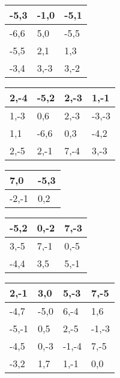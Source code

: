 \documentclass{article}
\begin{document}
\begin{table}[]
\centering
\begin{tabular}{|l|l|l|}
\hline-5,3 & -1,0 & -5,1\\ \hline
-6,6 & 5,0 & -5,5\\ \hline
-5,5 & 2,1 & 1,3\\ \hline
-3,4 & 3,-3 & 3,-2\\ \hline
\end{tabular}
\end{table}

\begin{table}[]
\centering
\begin{tabular}{|l|l|l|l|}
\hline2,-4 & -5,2 & 2,-3 & 1,-1\\ \hline
1,-3 & 0,6 & 2,-3 & -3,-3\\ \hline
1,1 & -6,6 & 0,3 & -4,2\\ \hline
2,-5 & 2,-1 & 7,-4 & 3,-3\\ \hline
\end{tabular}
\end{table}

\begin{table}[]
\centering
\begin{tabular}{|l|l|}
\hline7,0 & -5,3\\ \hline
-2,-1 & 0,2\\ \hline
\end{tabular}
\end{table}

\begin{table}[]
\centering
\begin{tabular}{|l|l|l|}
\hline-5,2 & 0,-2 & 7,-3\\ \hline
3,-5 & 7,-1 & 0,-5\\ \hline
-4,4 & 3,5 & 5,-1\\ \hline
\end{tabular}
\end{table}

\begin{table}[]
\centering
\begin{tabular}{|l|l|l|l|}
\hline2,-1 & 3,0 & 5,-3 & 7,-5\\ \hline
-4,7 & -5,0 & 6,-4 & 1,6\\ \hline
-5,-1 & 0,5 & 2,-5 & -1,-3\\ \hline
-4,5 & 0,-3 & -1,-4 & 7,-5\\ \hline
-3,2 & 1,7 & 1,-1 & 0,0\\ \hline
\end{tabular}
\end{table}
\end{document}

